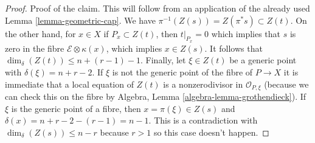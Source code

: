 \documentclass[10pt,a4paper]{amsart}
\theoremstyle{plain}
\theoremstyle{definition}
\theoremstyle{remark}
\numberwithin{equation}{subsection}
\begin{document}
\begin{proof}
\medskip\noindent
Proof of the claim. This will follow from an application of
the already used Lemma \ref{lemma-geometric-cap}.
We have $\pi^{-1}(Z(s)) = Z(\pi^*s) \subset Z(t)$.
On the other hand, for $x \in X$ if $P_x \subset Z(t)$, then
$t|_{P_x} = 0$ which implies that $s$ is zero in the fibre
$\mathcal{E} \otimes \kappa(x)$, which implies $x \in Z(s)$.
It follows that $\dim_\delta(Z(t)) \leq n + (r - 1) - 1$.
Finally, let $\xi \in Z(t)$ be a generic point with
$\delta(\xi) = n + r - 2$. If $\xi$ is not the generic point
of the fibre of $P \to X$ it is immediate that
a local equation of $Z(t)$ is a nonzerodivisor in $\mathcal{O}_{P, \xi}$
(because we can check this on the fibre by
Algebra, Lemma \ref{algebra-lemma-grothendieck}).
If $\xi$ is the generic point of a fibre, then $x = \pi(\xi) \in Z(s)$
and $\delta(x) = n + r - 2 - (r - 1) = n - 1$. This is a contradiction
with $\dim_\delta(Z(s)) \leq n - r$ because $r > 1$
so this case doesn't happen.
\end{proof}
\end{document}
